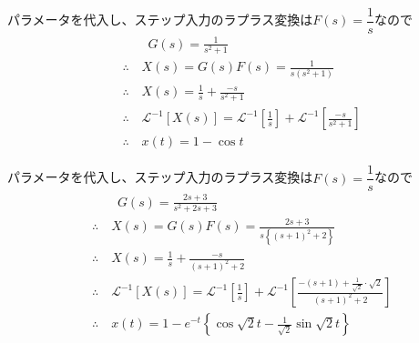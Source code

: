 \documentclass[a4paper,12pt]{article}
\begin{document}
\begin{tcolorbox}[title={7.(6)\quad \( m=1,d=0,k=1\)とし、ステップ応答を求めよ。
    }]
    パラメータを代入し、ステップ入力のラプラス変換は\(F(s)=\dfrac{1}{s}\)なので
    \vspace{-4mm}
    \begin{align*}
        &\qquad G(s) = \frac{1}{s^2 + 1} \\
        &\therefore \quad X(s) = G(s) F(s) = \frac{1}{s(s^2+1)} \\
        &\therefore \quad X(s) = \frac{1}{s}+\frac{-s}{s^2+1} \\
        &\therefore \quad \mathcal{L}^{-1} \left[ X(s)\right] 
        = \mathcal{L}^{-1} \left[\frac{1}{s}\right] 
        + \mathcal{L}^{-1} \left[\frac{-s}{s^2+1} \right] \\
        &\therefore \quad x(t) = 1 - \cos t
    \end{align*}
\end{tcolorbox}
\begin{tcolorbox}[title={7.(7)\quad \( m=1,d=2,k=3\)とし、ステップ応答を求めよ。
    }]
    パラメータを代入し、ステップ入力のラプラス変換は\(F(s)=\dfrac{1}{s}\)なので
    \vspace{-4mm}
    \begin{align*}
        &\qquad G(s) = \frac{2s+3}{s^2 + 2s+ 3} \\
        &\therefore \quad X(s) = G(s) F(s) = \frac{2s+3}{s\left\{(s+1)^2+2\right\}} \\
        &\therefore \quad X(s) = \frac{1}{s}+\frac{-s}{(s+1)^2+2} \\
        &\therefore \quad \mathcal{L}^{-1} \left[ X(s)\right] 
        = \mathcal{L}^{-1} \left[\frac{1}{s}\right] 
        + \mathcal{L}^{-1} \left[\frac{-(s+1) + \frac{1}{\sqrt{2}}\cdot \sqrt{2}}{(s+1)^2+2} \right] \\
        &\therefore \quad x(t) = 1 - e^{-t} \left\{ \cos \sqrt{2}t - \frac{1}{\sqrt{2}} \sin \sqrt{2}t \right\}
    \end{align*}
\end{tcolorbox}
\end{document}
